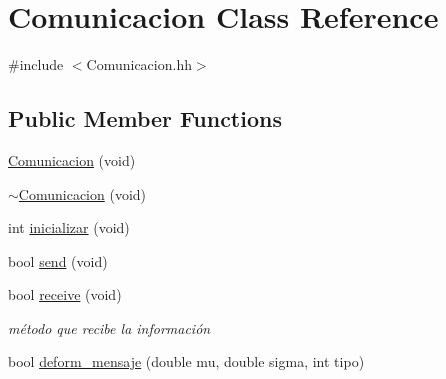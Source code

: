 \hypertarget{class_comunicacion}{\section{Comunicacion Class Reference}
\label{class_comunicacion}
}


{\ttfamily \#include $<$Comunicacion.\-hh$>$}

\subsection*{Public Member Functions}
\begin{DoxyCompactItemize}
\item 
\hyperlink{class_comunicacion_ab93568954c78f17c0d69c879451d6726}{Comunicacion} (void)
\item 
\hyperlink{class_comunicacion_a5a63fa573ca705e34df669c7d5796a53}{$\sim$\-Comunicacion} (void)
\item 
int \hyperlink{class_comunicacion_a9aabc8fdbbe440466b43d886e9389803}{inicializar} (void)
\item 
bool \hyperlink{class_comunicacion_a76dbc8f89b7a4a200f10295c6cd64914}{send} (void)
\item 
bool \hyperlink{class_comunicacion_a59e7c001750e00105631cb77e37dc920}{receive} (void)
\begin{DoxyCompactList}\small\item\em método que recibe la información \end{DoxyCompactList}\item 
bool \hyperlink{class_comunicacion_a22caa0a409faab207b8d2e92b121ccac}{deform\-\_\-mensaje} (double mu, double sigma, int tipo)
\end{DoxyCompactItemize}


